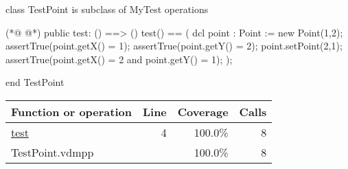 \begin{vdmpp}[breaklines=true]
class TestPoint is subclass of MyTest
operations

(*@
\label{test:4}
@*)
 public test: () ==> ()
 test() ==
 (
  dcl point : Point := new Point(1,2);
  assertTrue(point.getX() = 1);
  assertTrue(point.getY() = 2);
  point.setPoint(2,1);
  assertTrue(point.getX() = 2 and point.getY() = 1);
 );


end TestPoint
\end{vdmpp}
\bigskip
\begin{longtable}{|l|r|r|r|}
\hline
Function or operation & Line & Coverage & Calls \\
\hline
\hline
\hyperref[test:4]{test} & 4&100.0\% & 8 \\
\hline
\hline
TestPoint.vdmpp & & 100.0\% & 8 \\
\hline
\end{longtable}

